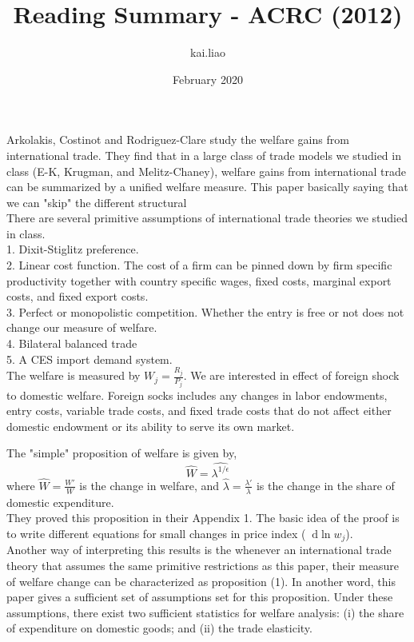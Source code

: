 \documentclass{article}
\title{Reading Summary - ACRC (2012)}
\author{kai.liao }
\date{February 2020}
\newcommand*\diff{\mathop{}\!\mathrm{d}}
\begin{document}
\maketitle
Arkolakis, Costinot and Rodriguez-Clare study the welfare gains from international trade. They find that in a large class of trade models we studied in class (E-K, Krugman, and Melitz-Chaney), welfare gains from international trade can be summarized by a unified welfare measure. This paper basically saying that we can "skip" the different structural \\

There are several primitive assumptions of international trade theories we studied in class.\\
1. Dixit-Stiglitz preference. \\
2. Linear cost function. The cost of a firm can be pinned down by firm specific productivity together with country specific wages, fixed costs, marginal export costs, and fixed export costs.\\
3. Perfect or monopolistic competition. Whether the entry is free or not does not change our measure of welfare.\\
4. Bilateral balanced trade\\
5. A CES import demand system.\\

The welfare is measured by $W_j = \frac{R_j}{P_j}$. We are interested in effect of foreign shock to domestic welfare. Foreign socks includes  any changes in labor endowments, entry costs, variable trade costs, and fixed trade costs that do not affect either domestic
endowment or its ability to serve its own market.

The "simple" proposition of welfare is given by,
\begin{equation}
    \hat{W} = \hat{\lambda^{1/\epsilon}}
\end{equation}
where $\hat{W} = \frac{W'}{W}$ is the change in welfare, and $\hat{\lambda} = \frac{\lambda'}{\lambda}$ is the change in the share of domestic expenditure.\\

They proved this proposition in their Appendix 1. The basic idea of the proof is to write different equations for small changes in price index ($\diff\ln{w_j}$).\\

Another way of interpreting this results is the whenever an international trade theory that assumes the same primitive restrictions as this paper, their measure of welfare change can be characterized as proposition (1). In another word, this paper gives a sufficient set of assumptions set for this proposition. Under these assumptions, there exist two
sufficient statistics for welfare analysis: (i) the share of expenditure on domestic
goods; and (ii) the trade elasticity.\\
\end{document}

